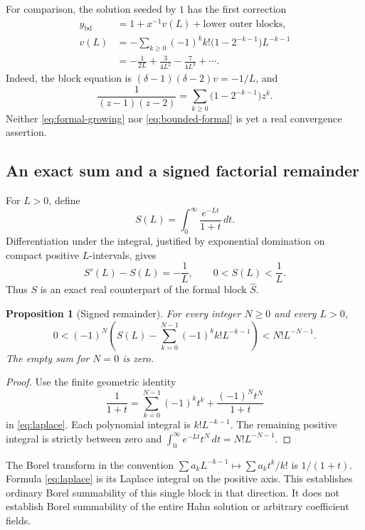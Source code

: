 \documentclass[11pt,a4paper]{article}
\numberwithin{equation}{section}
\newtheorem{proposition}[proposition]{Proposition}
\theoremstyle{definition}
\theoremstyle{remark}
\begin{document}
For comparison, the solution seeded by $1$ has the first correction
\begin{align}
 y_{\mathrm{bd}}&=1+x^{-1}v(L)+\text{lower outer blocks},\\
 v(L)&=-\sum_{k\ge0}(-1)^k k!\bigl(1-2^{-k-1}\bigr)L^{-k-1}\nonumber\\
 &=-\frac1{2L}+\frac3{4L^2}-\frac7{4L^3}+\cdots.
 \label{eq:bounded-formal}
\end{align}
Indeed, the block equation is $(\delta-1)(\delta-2)v=-1/L$, and
\[
 \frac1{(z-1)(z-2)}
 =\sum_{k\ge0}\bigl(1-2^{-k-1}\bigr)z^k.
\]
Neither \eqref{eq:formal-growing} nor \eqref{eq:bounded-formal} is yet a real convergence assertion.

\subsection{An exact sum and a signed factorial remainder}
For $L>0$, define
\begin{equation}
 S(L)=\int_0^\infty\frac{e^{-Lt}}{1+t}\,dt.
 \label{eq:laplace}
\end{equation}
Differentiation under the integral, justified by exponential domination on compact positive $L$-intervals, gives
\begin{equation}
 S'(L)-S(L)=-\frac1L,
 \qquad 0<S(L)<\frac1L.
 \label{eq:S-ode}
\end{equation}
Thus $S$ is an exact real counterpart of the formal block $\widehat S$.

\begin{proposition}[Signed remainder]
\label{prop:factorial-remainder}
For every integer $N\ge0$ and every $L>0$,
\begin{equation}
 0<(-1)^N\left(S(L)-\sum_{k=0}^{N-1}(-1)^kk!L^{-k-1}\right)
 <N!L^{-N-1}.
 \label{eq:factorial-remainder}
\end{equation}
The empty sum for $N=0$ is zero.
\end{proposition}
\begin{proof}
Use the finite geometric identity
\[
 \frac1{1+t}=\sum_{k=0}^{N-1}(-1)^kt^k+
 \frac{(-1)^Nt^N}{1+t}
\]
in \eqref{eq:laplace}. Each polynomial integral is $k!L^{-k-1}$. The remaining positive integral is strictly between zero and
$\int_0^\infty e^{-Lt}t^N\,dt=N!L^{-N-1}$.
\end{proof}
The Borel transform in the convention
$\sum a_kL^{-k-1}\mapsto\sum a_kt^k/k!$
is $1/(1+t)$. Formula \eqref{eq:laplace} is its Laplace integral on the positive axis. This establishes ordinary Borel summability of this single block in that direction. It does not establish Borel summability of the entire Hahn solution or arbitrary coefficient fields.
\end{document}
